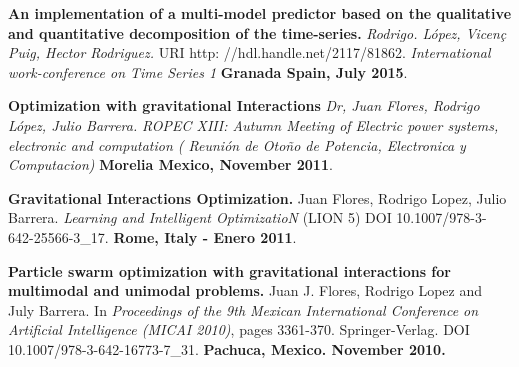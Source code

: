 \documentclass[10pt]{article}
\newenvironment{innerlist}[1][\enskip\textbullet]%
        {\begin{compactitem}[#1]}{\end{compactitem}}
\begin{document}
\begin{innerlist}
\item \textbf{An implementation of a multi-model predictor based on the qualitative and quantitative decomposition of the time-series.} \textit{Rodrigo. López, Vicen\c{c} Puig, Hector Rodriguez.} URI http: //hdl.handle.net/2117/81862. \textit{International work-conference on Time Series 1 
} \textbf{Granada Spain, July 2015}.

\item \textbf{Optimization with gravitational Interactions} \textit{Dr, Juan Flores, Rodrigo López, Julio Barrera.}   \textit{ROPEC XIII: Autumn Meeting of Electric power systems, electronic and computation ( Reunión de Oto\~no de Potencia, Electronica y Computacion)} \textbf{ Morelia Mexico, November 2011}.

\item \textbf{Gravitational Interactions Optimization.} Juan Flores, Rodrigo Lopez, Julio Barrera.  \textit{Learning and Intelligent OptimizatioN}  (LION 5) DOI 10.1007/978-3-642-25566-3\_17. \textbf{Rome, Italy - Enero 2011}. 

\item \textbf{Particle swarm optimization with gravitational interactions for multimodal and unimodal problems.} Juan J. Flores, Rodrigo Lopez and July Barrera.  In \textit{Proceedings of the 9th Mexican International Conference on Artificial Intelligence (MICAI 2010)}, pages 3361-370. Springer-Verlag. DOI 10.1007/978-3-642-16773-7\_31. \textbf{Pachuca, Mexico. November 2010.}

\end{innerlist}
\end{document}
